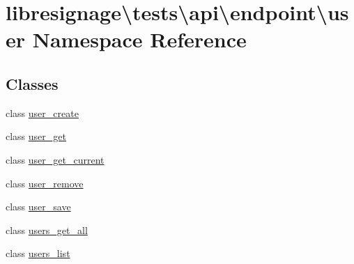 \hypertarget{namespacelibresignage_1_1tests_1_1api_1_1endpoint_1_1user}{}\section{libresignage\textbackslash{}tests\textbackslash{}api\textbackslash{}endpoint\textbackslash{}user Namespace Reference}
\label{namespacelibresignage_1_1tests_1_1api_1_1endpoint_1_1user}
\subsection*{Classes}
\begin{DoxyCompactItemize}
\item 
class \hyperlink{classlibresignage_1_1tests_1_1api_1_1endpoint_1_1user_1_1user__create}{user\+\_\+create}
\item 
class \hyperlink{classlibresignage_1_1tests_1_1api_1_1endpoint_1_1user_1_1user__get}{user\+\_\+get}
\item 
class \hyperlink{classlibresignage_1_1tests_1_1api_1_1endpoint_1_1user_1_1user__get__current}{user\+\_\+get\+\_\+current}
\item 
class \hyperlink{classlibresignage_1_1tests_1_1api_1_1endpoint_1_1user_1_1user__remove}{user\+\_\+remove}
\item 
class \hyperlink{classlibresignage_1_1tests_1_1api_1_1endpoint_1_1user_1_1user__save}{user\+\_\+save}
\item 
class \hyperlink{classlibresignage_1_1tests_1_1api_1_1endpoint_1_1user_1_1users__get__all}{users\+\_\+get\+\_\+all}
\item 
class \hyperlink{classlibresignage_1_1tests_1_1api_1_1endpoint_1_1user_1_1users__list}{users\+\_\+list}
\end{DoxyCompactItemize}
